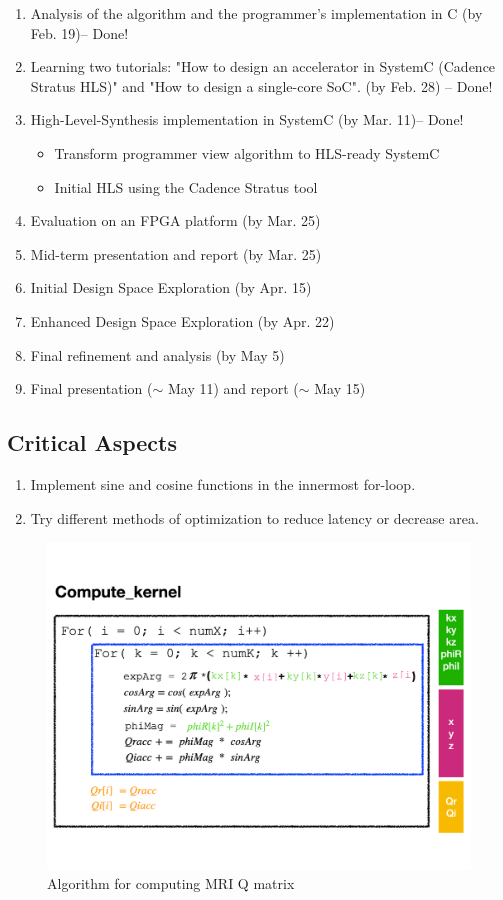 \vspace{-0.1in}
\begin{enumerate}
\setlength\itemsep{-0.15em}
  \item Analysis of the algorithm and the programmer's implementation in C (by Feb. 19)-- Done!
  \item Learning two tutorials: "How to design an accelerator in SystemC (Cadence Stratus HLS)" and "How to design a single-core SoC"\cite{esp1}. (by Feb. 28) -- Done!
  \item High-Level-Synthesis implementation in SystemC (by Mar. 11)-- Done!
  \vspace{-2mm}
       \begin{itemize}
            \item Transform programmer view algorithm to HLS-ready SystemC
            \item Initial HLS using the Cadence Stratus tool
       \end{itemize}

  \item Evaluation on an FPGA platform (by Mar. 25)
  \item Mid-term presentation and report (by Mar. 25)
  \item Initial Design Space Exploration (by Apr. 15)
  \item Enhanced Design Space Exploration (by Apr. 22)
  \item Final refinement and analysis (by May 5)
  \item Final presentation ($\sim$ May 11) and report ($\sim$ May 15)
\end{enumerate}

\subsection{Critical Aspects}
\begin{enumerate}
\setlength\itemsep{-0.15em}
\item Implement sine and cosine functions in the innermost for-loop.
\item Try different methods of optimization to reduce latency or decrease area.
\end{enumerate}

\begin{figure}[t]
\centering
\captionsetup{justification=centering, format=hang}
\includegraphics[width=0.85\columnwidth]{figures/algorithm}
\caption{Algorithm for computing MRI Q matrix~\cite{stone2008accelerating}}
\label{fig-1}
\end{figure}
